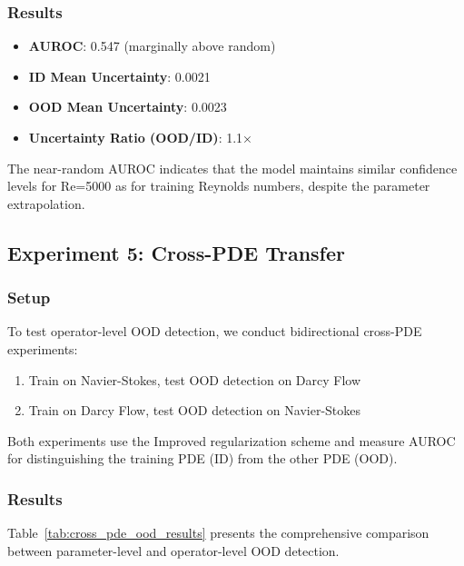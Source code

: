\subsubsection{Results}

\begin{itemize}
\item \textbf{AUROC}: 0.547 (marginally above random)
\item \textbf{ID Mean Uncertainty}: 0.0021
\item \textbf{OOD Mean Uncertainty}: 0.0023
\item \textbf{Uncertainty Ratio (OOD/ID)}: 1.1×
\end{itemize}

The near-random AUROC indicates that the model maintains similar confidence levels for Re=5000 as for training Reynolds numbers, despite the parameter extrapolation.

\subsection{Experiment 5: Cross-PDE Transfer}

\subsubsection{Setup}

To test operator-level OOD detection, we conduct bidirectional cross-PDE experiments:
\begin{enumerate}
\item Train on Navier-Stokes, test OOD detection on Darcy Flow
\item Train on Darcy Flow, test OOD detection on Navier-Stokes
\end{enumerate}

Both experiments use the Improved regularization scheme and measure AUROC for distinguishing the training PDE (ID) from the other PDE (OOD).

\subsubsection{Results}

Table~\ref{tab:cross_pde_ood_results} presents the comprehensive comparison between parameter-level and operator-level OOD detection.

